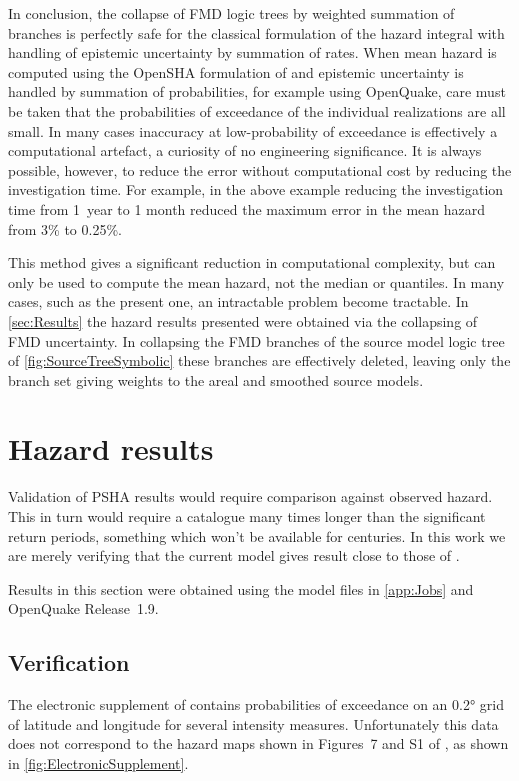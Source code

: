 \documentclass{article}
\begin{document}
In conclusion, the collapse of FMD logic trees by weighted summation of branches is perfectly safe for the classical formulation of the hazard integral with handling of epistemic uncertainty by summation of rates. 
When mean hazard is computed using the OpenSHA formulation of \cite{field2003opensha} and epistemic uncertainty is handled by summation of probabilities, for example using OpenQuake, care must be taken that the probabilities of exceedance of the individual realizations are all small.
In many cases inaccuracy at low-probability of exceedance is effectively a computational artefact, a curiosity of no engineering significance.
It is always possible, however, to reduce the error without computational cost by reducing the investigation time.
For example, in the above example reducing the investigation time from 1~year to 1 month reduced the maximum error in the mean hazard from 3\% to 0.25\%.

This method gives a significant reduction in computational complexity, but can only be used to compute the mean hazard, not the median or quantiles. 
In many cases, such as the present one, an intractable problem become tractable.
In \autoref{sec:Results} the hazard results presented were obtained via the collapsing of FMD uncertainty.
In collapsing the FMD branches of the source model logic tree of \autoref{fig:SourceTreeSymbolic} these branches are effectively deleted, leaving only the branch set giving weights to the areal and smoothed source models.

\section{Hazard results}
\label{sec:Results}

Validation of PSHA results would require comparison against observed hazard. 
This in turn would require a catalogue many times longer than the significant return periods, something which won't be available for centuries.
In this work we are merely verifying that the current model gives result close to those of \cite{nath2012probabilistic}.

Results in this section were obtained using the model files in \autoref{app:Jobs} and OpenQuake Release~1.9.

\subsection{Verification}
\label{subsec:Verification}

The electronic supplement of \cite{nath2012probabilistic} contains probabilities of exceedance on an 0.2° grid of latitude and longitude for several intensity measures. 
Unfortunately this data does not correspond to the hazard maps shown in Figures~7 and S1 of \cite{nath2012probabilistic}, as shown in \autoref{fig:ElectronicSupplement}.
\end{document}
